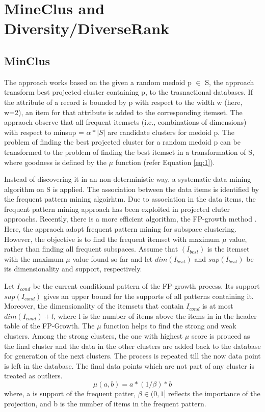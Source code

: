 \chapter{MineClus and Diversity/DiverseRank}
\label{Chapter3}

\section{MinClus}
The approach works based on the given a random medoid p $ \in $ S, the approach transform best projected cluster containing p, to the trasnactional databases. 
If the attribute of a record is bounded by p with respect to the width w (here, w=2), an item for that attribute is added to the corresponding itemset.
The appraoch observe that all frequent itemsets (i.e., combinations of dimensions) with respect to minsup = $\alpha * |S|$ are candidate clusters for medoid p.
The problem of finding the best projected cluster for a random medoid p can be transformed to the problem of finding the best itemset in a transformation of S, where goodness is defined by the $\mu$ function (refer Equation \ref{eq:1}).

Instead of discovering it in an non-deterministic way, a systematic data mining algorithm on S is applied. 
The association between the data items is identified by the frequent pattern mining algoirhtm. 
Due to association in the data items, the frequent pattern mining approach has been exploited in projected cluter approachs.
Recently, there is a more efficient algorithm, the FP-growth method \cite{bib8}. 
Here, the appraoch adopt frequent pattern mining for subspace clustering.
However, the objective is to find the frequent itemset with maximum $\mu$ value, rather than finding all frequent subspaces.
Assume that $(I_{best})$ is the itemset with the maximum $\mu$ value found so far and let $dim(I_{best})$ and $sup(I_{best})$ be its dimensionality and support, respectively. 

Let $I_{cond}$ be the current conditional pattern of the FP-growth process. Its support $sup(I_{cond})$ gives an upper bound for the supports of all patterns containing it. 
Moreover, the dimensionality of the itemsets that contain $I_{cond}$ is at most $dim(I_{cond})+l$, where l is the number of items above the items in in the header table of the FP-Growth. 
The $\mu$ function helps to find the strong and weak clusters. 
Among the strong clusters, the one with highest $\mu$ score is prouced as the final cluster and the data in the other clusters are added back to the database for generation of the next clusters. 
The process is repeated till the now data point is left in the database. 
The final data points which are not part of any cluster is treated as outliers.
\begin{equation}\label{eq:1}
\mu(a, b) = a * (1/\beta) * b
\end{equation}
where, a is support of the frequent patter, $\beta \in (0, 1]$ reflects
the importance of the projection, and b is the number of items in the frequent pattern.

